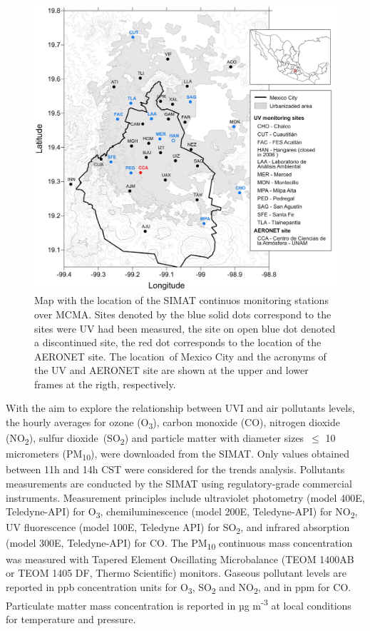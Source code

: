 \documentclass[10pt]{article}
\begin{document}
\begin{figure}[H]
  \begin{center}
    \includegraphics[width=0.70\columnwidth]{figures/MapaUV v4Dec20/MapaUV v4Dec20}
    \caption{{Map with the location of the SIMAT continuos monitoring stations over
          MCMA. Sites denoted by the blue solid dots correspond to the sites were
          UV had been measured, the site on open blue dot denoted a discontinued
          site, the red dot corresponds to the location of the AERONET site. The
          location~of Mexico City and the acronyms of the UV and AERONET site are
          shown at the upper and lower frames at the rigth, respectively.
            {\label{977905}}%
        }}
  \end{center}
\end{figure}

With the aim to explore the relationship between UVI and air pollutants
levels, the hourly averages for ozone (O\textsubscript{3}), carbon
monoxide (CO), nitrogen dioxide (NO\textsubscript{2}), sulfur
dioxide~(SO\textsubscript{2}) and particle matter with diameter
sizes~\(\le\) 10 micrometers (PM\textsubscript{10}), were
downloaded from the SIMAT\cite{atmosfrico}. Only values obtained
between 11h and 14h CST were considered for the trends analysis.
Pollutants measurements are conducted by the SIMAT using
regulatory-grade commercial instruments. Measurement principles include
ultraviolet photometry (model 400E, Teledyne-API) for
O\textsubscript{3}, chemiluminescence (model 200E, Teledyne-API) for
NO\textsubscript{2}, UV fluorescence (model 100E, Teledyne API) for
SO\textsubscript{2}, and infrared absorption (model 300E, Teledyne-API)
for CO. The PM\textsubscript{10} continuous mass concentration was
measured with Tapered Element Oscillating Microbalance (TEOM 1400AB or
TEOM 1405 DF, Thermo Scientific) monitors. Gaseous pollutant levels are
reported in ppb concentration units for O\textsubscript{3},
SO\textsubscript{2} and NO\textsubscript{2}, and in ppm for CO.
Particulate matter mass concentration is reported in µg
m\textsuperscript{-3} at local conditions for temperature and pressure.
\end{document}
